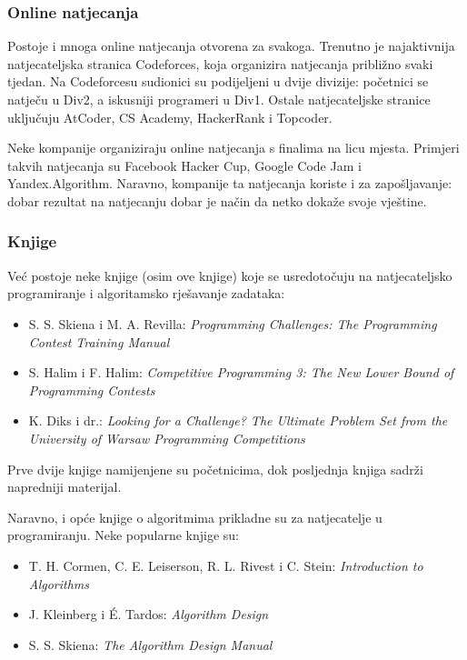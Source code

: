 \subsubsection{Online natjecanja}

Postoje i mnoga online natjecanja otvorena za svakoga.
Trenutno je najaktivnija natjecateljska stranica Codeforces,
koja organizira natjecanja približno svaki tjedan.
Na Codeforcesu sudionici su podijeljeni u dvije divizije:
početnici se natječu u Div2, a iskusniji programeri u Div1.
Ostale natjecateljske stranice uključuju AtCoder, CS Academy, HackerRank i Topcoder.

Neke kompanije organiziraju online natjecanja s finalima na licu mjesta.
Primjeri takvih natjecanja su Facebook Hacker Cup,
Google Code Jam i Yandex.Algorithm.
Naravno, kompanije ta natjecanja koriste i za zapošljavanje:
dobar rezultat na natjecanju dobar je način da netko dokaže svoje vještine.

\subsubsection{Knjige}

Već postoje neke knjige (osim ove knjige) koje se
usredotočuju na natjecateljsko programiranje i algoritamsko rješavanje zadataka:

\begin{itemize}
\item S. S. Skiena i M. A. Revilla:
\emph{Programming Challenges: The Programming Contest Training Manual} \cite{ski03}
\item S. Halim i F. Halim:
\emph{Competitive Programming 3: The New Lower Bound of Programming Contests} \cite{hal13}
\item K. Diks i dr.: \emph{Looking for a Challenge? The Ultimate Problem Set from
the University of Warsaw Programming Competitions} \cite{dik12}
\end{itemize}

Prve dvije knjige namijenjene su početnicima,
dok posljednja knjiga sadrži napredniji materijal.

Naravno, i opće knjige o algoritmima prikladne su za
natjecatelje u programiranju.
Neke popularne knjige su:

\begin{itemize}
\item T. H. Cormen, C. E. Leiserson, R. L. Rivest i C. Stein:
\emph{Introduction to Algorithms} \cite{cor09}
\item J. Kleinberg i É. Tardos:
\emph{Algorithm Design} \cite{kle05}
\item S. S. Skiena:
\emph{The Algorithm Design Manual} \cite{ski08}
\end{itemize}
